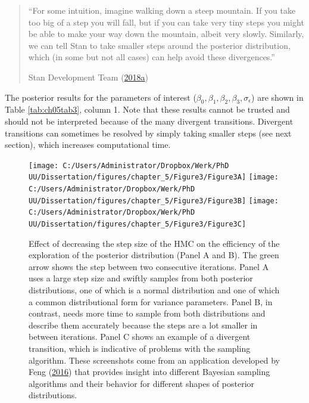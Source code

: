 \documentclass[openright,titlepage,12pt,a4paper]{book}
\begin{document}
\begin{quote}
``For some intuition, imagine walking down a steep mountain. If you take too big of a step you will fall, but if you can take very tiny steps you might be able to make your way down the mountain, albeit very slowly. Similarly, we can tell Stan to take smaller steps around the posterior distribution, which (in some but not all cases) can help avoid these divergences.''

Stan Development Team (\protect\hyperlink{ref-stan_development_team_brief_2018}{2018}\protect\hyperlink{ref-stan_development_team_brief_2018}{a})
\end{quote}

The posterior results for the parameters of interest (\(\beta_0, \beta_1, \beta_2, \beta_3, \sigma_\epsilon\)) are shown in Table \ref{tab:ch05tab3}, column 1. Note that these results cannot be trusted and should not be interpreted because of the many divergent transitions. Divergent transitions can sometimes be resolved by simply taking smaller steps (see next section), which increases computational time.



\begin{figure}

{\centering \texttt{[image: C:/Users/Administrator/Dropbox/Werk/PhD UU/Dissertation/figures/chapter\_5/Figure3/Figure3A]} \texttt{[image: C:/Users/Administrator/Dropbox/Werk/PhD UU/Dissertation/figures/chapter\_5/Figure3/Figure3B]} \texttt{[image: C:/Users/Administrator/Dropbox/Werk/PhD UU/Dissertation/figures/chapter\_5/Figure3/Figure3C]} 

}

\caption{Effect of decreasing the step size of the HMC on the efficiency of the exploration of the posterior distribution (Panel A and B). The green arrow shows the step between two consecutive iterations. Panel A uses a large step size and swiftly samples from both posterior distributions, one of which is a normal distribution and one of which a common distributional form for variance parameters. Panel B, in contrast, needs more time to sample from both distributions and describe them accurately because the steps are a lot smaller in between iterations. Panel C shows an example of a divergent transition, which is indicative of problems with the sampling algorithm. These screenshots come from an application developed by Feng (\protect\hyperlink{ref-feng_markov-chain_2016}{2016}) that provides insight into different Bayesian sampling algorithms and their behavior for different shapes of posterior distributions.}\label{fig:ch05fig3}
\end{figure}
\end{document}
